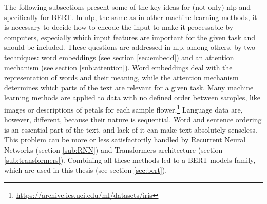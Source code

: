 The following subsections present some of the key ideas for (not only) \acrshort{nlp} and specifically for BERT. In \acrshort{nlp}, the same as in other machine learning methods, it is necessary to decide how to encode the input to make it processable by computers, especially which input features are important for the given task and should be included. These questions are addressed in \acrshort{nlp}, among others, by two techniques: word embeddings (see section \ref{sec:embedd}) and an attention mechanism (see section \ref{sub:attention}). Word embeddings deal with the representation of words and their meaning, while the attention mechanism determines which parts of the text are relevant for a given task. Many machine learning methods are applied to data with no defined order between samples, like images or descriptions of petals for each sample flower.\footnote{\url{https://archive.ics.uci.edu/ml/datasets/iris}}
Language data are, however, different, because their nature is sequential. Word and sentence ordering is an essential part of the text, and lack of it can make text absolutely senseless. This problem can be more or less satisfactorily handled by Recurrent Neural Networks (section \ref{sub:RNN}) and Transformers architecture (section \ref{sub:transformers}). Combining all these methods led to a BERT models family, which are used in this thesis (see section \ref{sec:bert}).

